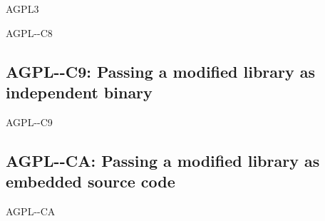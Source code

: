 \begin{license}{AGPL3}
\begin{lsuc}{AGPL-\ver-C8}
  \begin{lsucprohibits}
    \lsucitem{\noPatentLitigation}
  \end{lsucprohibits}
\end{lsuc}

\subsection{AGPL-\ver-C9: Passing a modified library as independent binary}
\begin{lsuc}{AGPL-\ver-C9}

  \useCaseNine

  \begin{lsucrequires}
    \lsucmandatory{\keepLicenseElements}
    \lsucmandatory{\gplthreeEnsureCopyrightNoticeSource}  
    \lsucmandatory{\giveLicense}\passingFilesCorrectly
    \lsucmandatory{\retainCopyrightNotices}
    \lsucmandatory{\makeModifiedSourceAvailable}
    \lsucmandatory{\describeHowToGetSource}
    \lsucmandatory{\markLibraryModifications}
    \lsucmandatory{\arrangeLibraryChanges}\howToApplyTheseTerms
    \lsucoptional{\createChangelog}
    \lsucoptional{\addToDocumentation}
  \end{lsucrequires}

  \begin{lsucprohibits}
    \lsucitem{\noPatentLitigation}
  \end{lsucprohibits}
\end{lsuc}

\subsection{AGPL-\ver-CA: Passing a modified library as embedded source code}
\begin{lsuc}{AGPL-\ver-CA}

  \useCaseA

  \begin{lsucrequires}
    \lsucmandatory{\keepLicenseElements}
    \lsucmandatory{\gplthreeEnsureCopyrightNoticeSource}
    \lsucmandatory{\giveLicense}\passingFilesCorrectly
    \lsucmandatory{\retainCopyrightNotices}
    \lsucmandatory{\addToCopyrightDialogLib}
    \lsucmandatory{\markEmbeddedModifications}
    \lsucmandatory{\arrangeEmbeddedChanges}\howToApplyTheseTerms
    \lsucmandatory{\arrangeEnclosingSources}
    \lsucoptional{\createChangelog}
    \lsucoptional{\addToDocumentation}
  \end{lsucrequires}


\end{lsuc}
\end{license}
